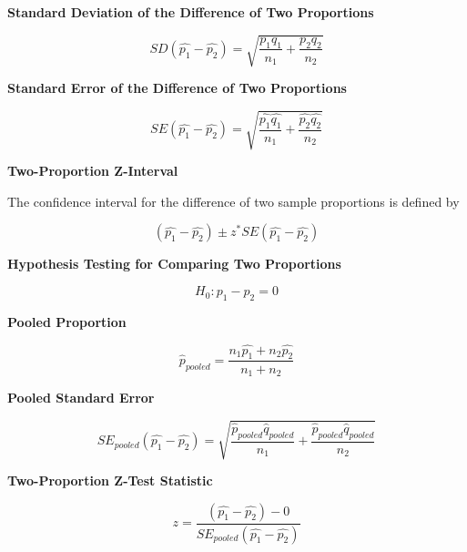 \documentclass{article}
\theoremstyle{definition}
\begin{document}
\vspace{2ex}
\textbf{Standard Deviation of the Difference of Two Proportions}

\begin{equation}
    SD(\hat{p_1} - \hat{p_2}) = \sqrt{\frac{p_1 q_1}{n_1} + \frac{p_2 q_2}{n_2}}
\end{equation}

\vspace{2ex}
\textbf{Standard Error of the Difference of Two Proportions}

\begin{equation}
    SE(\hat{p_1} - \hat{p_2}) = \sqrt{\frac{\hat{p_1} \hat{q_1}}{n_1} + \frac{\hat{p_2} \hat{q_2}}{n_2}}
\end{equation}

\vspace{2ex}
\textbf{Two-Proportion Z-Interval}

The confidence interval for the difference of two sample proportions is defined by

\begin{equation}
    (\hat{p_1} - \hat{p_2}) \pm z^* SE(\hat{p_1} - \hat{p_2})
\end{equation}

\vspace{2ex}
\textbf{Hypothesis Testing for Comparing Two Proportions}

\begin{equation}
    H_0: p_1 - p_2 = 0
\end{equation}

\vspace{2ex}
\textbf{Pooled Proportion}

\begin{equation}
    \hat{p}_{pooled} = \frac{n_1 \hat{p_1} + n_2 \hat{p_2}}{n_1 + n_2}
\end{equation}

\vspace{2ex}
\textbf{Pooled Standard Error}

\begin{equation}
    SE_{pooled}(\hat{p_1} - \hat{p_2}) = \sqrt{\frac{\hat{p}_{pooled} \hat{q}_{pooled}}{n_1} + \frac{\hat{p}_{pooled} \hat{q}_{pooled}}{n_2}}
\end{equation}

\vspace{2ex}
\textbf{Two-Proportion Z-Test Statistic}

\begin{equation}
    z = \frac{(\hat{p_1} - \hat{p_2}) - 0}{SE_{pooled}(\hat{p_1} - \hat{p_2})}
\end{equation}
\end{document}
